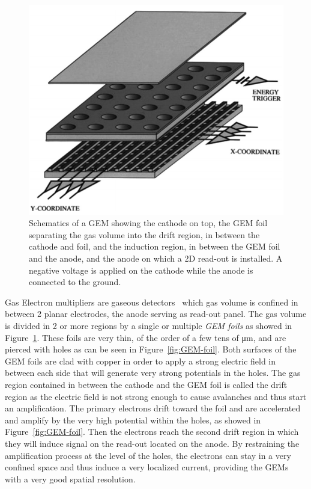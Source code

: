 	\begin{figure}[H]
		\centering
		\includegraphics[width=0.5\plotwidth]{fig/chapt3/GEM.png}
		\caption{\label{fig:GEM} Schematics of a GEM showing the cathode on top, the GEM foil separating the gas volume into the drift region, in between the cathode and foil, and the induction region, in between the GEM foil and the anode, and the anode on which a 2D read-out is installed. A negative voltage is applied on the cathode while the anode is connected to the ground.}
	\end{figure}
	
	Gas Electron multipliers are gaseous detectors~\cite{SAULI97} which gas volume is confined in between 2 planar electrodes, the anode serving as read-out panel. The gas volume is divided in 2 or more regions by a single or multiple \textit{GEM foils} as showed in Figure~\ref{fig:GEM}. These foils are very thin, of the order of a few tens of \si{\micro m}, and are pierced with holes as can be seen in Figure~\ref{fig:GEM-foil}. Both surfaces of the GEM foils are clad with copper in order to apply a strong electric field in between each side that will generate very strong potentials in the holes. The gas region contained in between the cathode and the GEM foil is called the drift region as the electric field is not strong enough to cause avalanches and thus start an amplification. The primary electrons drift toward the foil and are accelerated and amplify by the very high potential within the holes, as showed in Figure~\ref{fig:GEM-foil}. Then the electrons reach the second drift region in which they will induce signal on the read-out located on the anode. By restraining the amplification process at the level of the holes, the electrons can stay in a very confined space and thus induce a very localized current, providing the GEMs with a very good spatial resolution.

